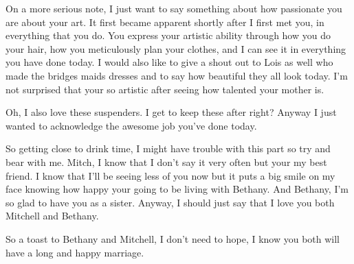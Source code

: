On a more serious note, I just want to say something about how passionate you are about your art. It first became apparent shortly after I first met you, in everything that you do. You express your artistic ability through how you do your hair, how you meticulously plan your clothes, and I can see it in everything you have done today. I would also like to give a shout out to Lois as well who made the bridges maids dresses and to say how beautiful they all look today. I'm not surprised that your so artistic after seeing how talented your mother is. 

Oh, I also love these suspenders. I get to keep these after right? Anyway I just wanted to acknowledge the awesome job you've done today.

So getting close to drink time, I might have trouble with this part so try and bear with me. Mitch, I know that I don't say it very often but your my best friend. I know that I'll be seeing less of you now but it puts a big smile on my face knowing how happy your going to be living with Bethany. And Bethany, I'm so glad to have you as a sister. Anyway, I should just say that I love you both Mitchell and Bethany.

So a toast to Bethany and Mitchell, I don't need to hope, I know you both will have a long and happy marriage.
